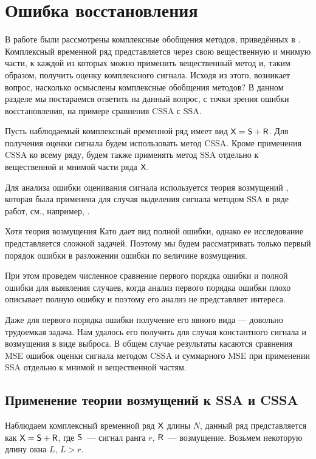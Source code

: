 \documentclass[specialist,
               substylefile = spbu.rtx,
               subf,href,colorlinks=true, 12pt]{disser}
\begin{document}
\chapter{Ошибка восстановления}

В работе были рассмотрены комплексные обобщения методов, приведённых в \cite{Tretyakova20}. Комплексный временной ряд представляется через свою вещественную и мнимую части, к каждой из которых можно применить вещественный метод и, таким образом, получить оценку комплексного сигнала. Исходя из этого, возникает вопрос, насколько осмыслены комплексные обобщения методов? В данном разделе мы постараемся ответить на данный вопрос, с точки зрения ошибки восстановления, на примере сравнения CSSA с SSA.

Пусть наблюдаемый комплексный временной ряд имеет вид $\textsf{X} =\textsf{S} + \textsf{R}$. Для получения оценки сигнала будем использовать метод CSSA. Кроме применения CSSA ко всему ряду, будем также применять метод SSA отдельно к вещественной и мнимой части ряда $\textsf{X}$.

Для анализа ошибки оценивания сигнала используется теория возмущений \cite{Kato}, которая была применена для случая выделения сигнала методом SSA в ряде работ, см., например, \cite{Nekrutkin}.

Хотя теория возмущения Като дает вид полной ошибки, однако ее исследование представляется сложной задачей. Поэтому мы будем рассматривать только первый порядок ошибки в разложении ошибки по величине возмущения.

При этом проведем численное сравнение первого порядка ошибки и полной ошибки для выявления случаев, когда анализ первого порядка ошибки плохо описывает полную ошибку и поэтому его анализ не представляет интереса.

Даже для первого порядка ошибки получение его явного вида --- довольно трудоемкая задача. Нам удалось его получить для случая константного сигнала и возмущения в виде выброса. В общем случае результаты касаются сравнения MSE ошибок оценки сигнала методом CSSA и суммарного MSE при применении SSA отдельно к мнимой и вещественной частям.


\section{Применение теории возмущений к SSA и CSSA}

Наблюдаем комплексный временной ряд $\textsf{X}$ длины $N$, данный ряд представляется как $\textsf{X} = \textsf{S} + \textsf{R}$, где $\textsf{S}$~--- сигнал ранга $r$, $\textsf{R}$~--- возмущение.  Возьмем некоторую длину окна $L$, $L>r$.
\end{document}
